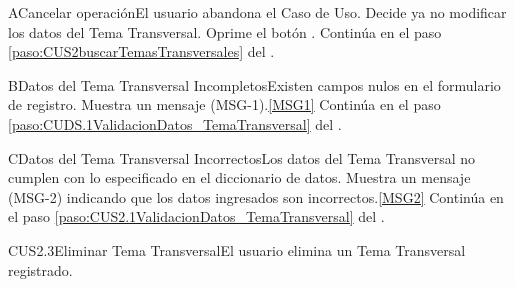 		\begin{UCtrayectoriaA}{A}{Cancelar operación}{El usuario abandona el Caso de Uso.}
			\UCpaso[\UCactor] Decide ya no modificar los datos del Tema Transversal.
			\UCpaso[\UCactor] Oprime el botón .
			\UCpaso Continúa en el paso \ref{paso:CUS2buscarTemasTransversales} del .
		\end{UCtrayectoriaA}

	\begin{UCtrayectoriaA}{B}{Datos del Tema Transversal Incompletos}{Existen campos nulos en el formulario de registro.}
			\UCpaso Muestra un mensaje (MSG-1).\ref{MSG1}
			\UCpaso Continúa en el paso \ref{paso:CUDS.1ValidacionDatos_TemaTransversal} del .
	\end{UCtrayectoriaA}

	\begin{UCtrayectoriaA}{C}{Datos del Tema Transversal Incorrectos}{Los datos del Tema Transversal no cumplen con lo especificado en el diccionario de datos.}
			\UCpaso Muestra un mensaje (MSG-2) indicando que los datos ingresados son incorrectos.\ref{MSG2}
			\UCpaso Continúa en el paso \ref{paso:CUS2.1ValidacionDatos_TemaTransversal} del .
	\end{UCtrayectoriaA}

	\begin{UseCase}{CUS2.3}{Eliminar Tema Transversal}{El usuario elimina un Tema Transversal registrado.}
	\end{UseCase}


